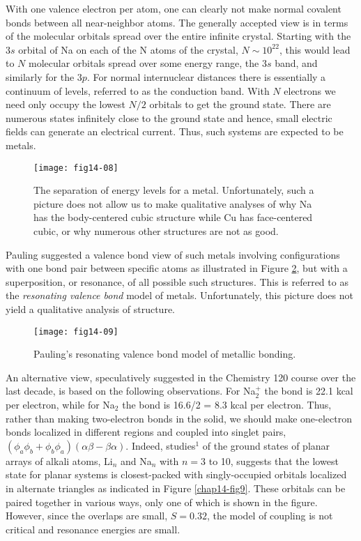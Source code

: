 With one valence electron per atom, one can clearly not make normal 
covalent bonds between all near-neighbor atoms.  The generally accepted 
view is in terms of the molecular orbitals spread over the entire infinite 
crystal. Starting with the $3s$ orbital of Na on each of the
N atoms of the crystal, $N \sim 10^{22}$, this would lead to $N$ 
molecular orbitals spread over some energy range, the $3s$ band, and 
similarly for the $3p$.  For normal internuclear distances there is
essentially a continuum of levels, referred to as the conduction band. 
With $N$ electrons we need only occupy the lowest $N/2$ orbitals to get 
the ground state.  There are numerous states
infinitely close to the ground state and hence, small electric fields can 
generate an electrical current.  Thus, such systems are expected to be
metals.

\begin{figure}
\texttt{[image: fig14-08]}
\caption{The separation of energy levels for a metal.  Unfortunately,
such a picture does not allow us to make qualitative analyses of why
Na has the body-centered cubic structure while Cu has face-centered
cubic, or why numerous other structures are not as good.}
\label{chap14-fig7}
\end{figure}

Pauling suggested a valence bond view of such metals involving
configurations with one bond pair between specific atoms as
illustrated in Figure \ref{chap14-fig8}, but with a superposition, or
resonance, of all possible such structures.  This is referred to as
the \emph{resonating valence bond} model of metals.  Unfortunately,
this picture does not yield a qualitative analysis of structure.

\begin{figure}
\texttt{[image: fig14-09]}
\caption{Pauling's resonating valence bond model of metallic bonding.}
\label{chap14-fig8}
\end{figure}

An alternative view, speculatively suggested in the Chemistry 120
course over the last decade, is based on the following observations.
For Na$^+_2$ the bond is 22.1 kcal per electron, while for Na$_2$ the
bond is 16.6/2 = 8.3 kcal per electron.  Thus, rather than making
two-electron bonds in the solid, we should make one-electron bonds
localized in different regions and coupled into singlet pairs,
$(\phi_a \phi_b + \phi_b \phi_a)(\alpha \beta - \beta
\alpha)$.  Indeed, studies$^1$ of the ground states of planar arrays of 
alkali atoms, Li$_n$ and Na$_n$ with $n = 3$ to 10, suggests that the
lowest state for planar systems is closest-packed with singly-occupied
orbitals localized in alternate triangles as indicated in Figure
\ref{chap14-fig9}.  These orbitals can be paired together in various
ways, only one of which is shown in the figure.  However, since the
overlaps are small, $S = 0.32$, the model of coupling is not critical
and resonance energies are small.

